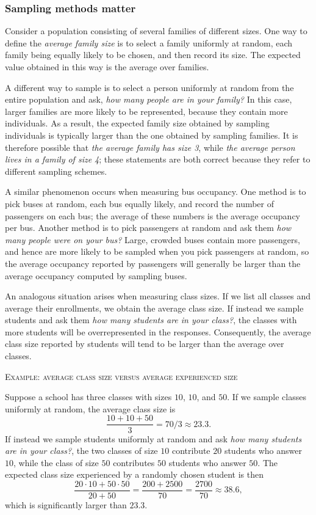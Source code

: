 \subsubsection{Sampling methods matter}

Consider a population consisting of several families of different sizes.  
One way to define the \textit{average family size} is to select a family uniformly at random, each family being equally likely to be chosen, and then record its size.  
The expected value obtained in this way is the average over families.  

A different way to sample is to select a person uniformly at random from the entire population and ask, \textit{how many people are in your family?}  
In this case, larger families are more likely to be represented, because they contain more individuals.  
As a result, the expected family size obtained by sampling individuals is typically larger than the one obtained by sampling families.  
It is therefore possible that \textit{the average family has size 3}, while \textit{the average person lives in a family of size 4}; these statements are both correct because they refer to different sampling schemes.  

A similar phenomenon occurs when measuring bus occupancy.  
One method is to pick buses at random, each bus equally likely, and record the number of passengers on each bus; the average of these numbers is the average occupancy per bus.  
Another method is to pick passengers at random and ask them \textit{how many people were on your bus?}  
Large, crowded buses contain more passengers, and hence are more likely to be sampled when you pick passengers at random, so the average occupancy reported by passengers will generally be larger than the average occupancy computed by sampling buses.  

An analogous situation arises when measuring class sizes.  
If we list all classes and average their enrollments, we obtain the average class size.  
If instead we sample students and ask them \textit{how many students are in your class?}, the classes with more students will be overrepresented in the responses.  
Consequently, the average class size reported by students will tend to be larger than the average over classes.  

\bigskip
\textsc{Example: average class size versus average experienced size}

Suppose a school has three classes with sizes \(10\), \(10\), and \(50\).  
If we sample classes uniformly at random, the average class size is
\[
\frac{10 + 10 + 50}{3} = 70/3 \approx 23.3.
\]
If instead we sample students uniformly at random and ask \textit{how many students are in your class?}, the two classes of size \(10\) contribute \(20\) students who answer \(10\), while the class of size \(50\) contributes \(50\) students who answer \(50\).  
The expected class size experienced by a randomly chosen student is then
\[
\frac{20 \cdot 10 + 50 \cdot 50}{20 + 50}
=
\frac{200 + 2500}{70}
=
\frac{2700}{70}
\approx 38.6,
\]
which is significantly larger than \(23.3\).  

